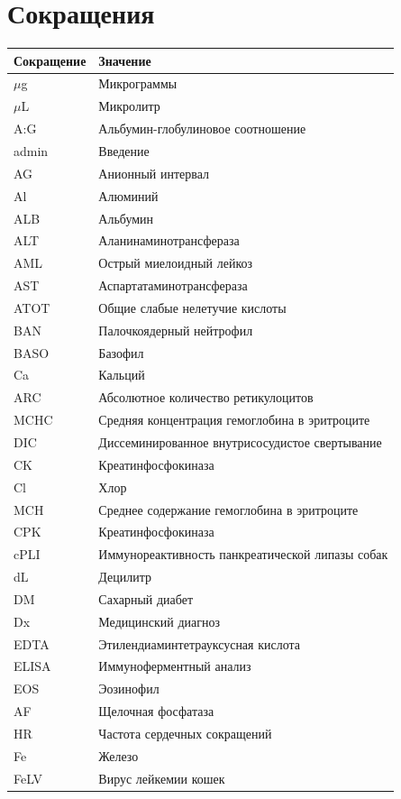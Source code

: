 \documentclass[a4paper,12pt]{book}
\begin{document}
\chapter{Сокращения}
\label{chap:abbrev}
\begin{longtable}{p{4cm} p{10cm}}
\textbf{Сокращение} & \textbf{Значение} \\
\hline
\endhead
$\mu$g & Микрограммы \\
$\mu$L & Микролитр \\
A:G & Альбумин-глобулиновое соотношение \\
admin & Введение \\
AG & Анионный интервал \\
Al & Алюминий \\
ALB & Альбумин \\
ALT & Аланинаминотрансфераза \\
AML & Острый миелоидный лейкоз \\
AST & Аспартатаминотрансфераза \\
ATOT & Общие слабые нелетучие кислоты \\
BAN & Палочкоядерный нейтрофил \\
BASO & Базофил \\
Ca & Кальций \\
ARC & Абсолютное количество ретикулоцитов \\
MCHC & Средняя концентрация гемоглобина в эритроците \\
DIC & Диссеминированное внутрисосудистое свертывание \\
CK & Креатинфосфокиназа \\
Cl & Хлор \\
MCH & Среднее содержание гемоглобина в эритроците \\
CPK & Креатинфосфокиназа \\
cPLI & Иммунореактивность панкреатической липазы собак \\
dL & Децилитр \\
DM & Сахарный диабет \\
Dx & Медицинский диагноз \\
EDTA & Этилендиаминтетрауксусная кислота \\
ELISA & Иммуноферментный анализ \\
EOS & Эозинофил \\
AF & Щелочная фосфатаза \\
HR & Частота сердечных сокращений \\
Fe & Железо \\
FeLV & Вирус лейкемии кошек \\

\end{longtable}
\end{document}
